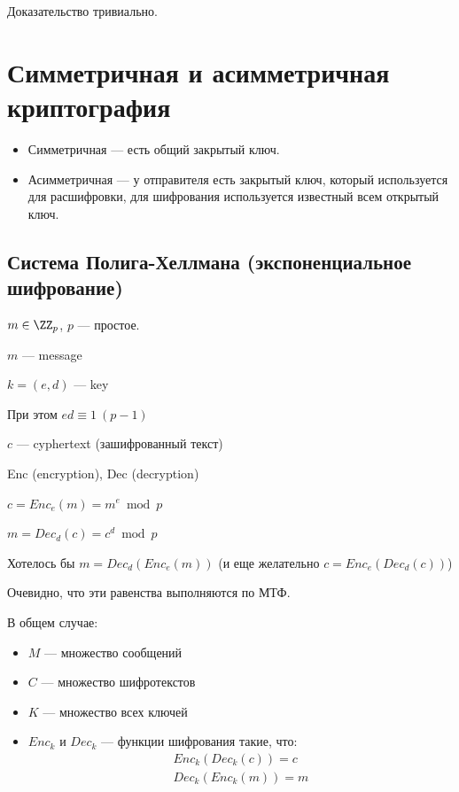 Доказательство тривиально.

\newpage

\section{Симметричная и асимметричная криптография}

\begin{defn}{}{}
    \begin{itemize}
        \item
            Симметричная --- есть общий закрытый ключ.
        \item
            Асимметричная --- у отправителя есть закрытый ключ,
            который используется для расшифровки, для шифрования используется
            известный всем открытый ключ.
    \end{itemize}
\end{defn}

\subsection{Система Полига-Хеллмана (экспоненциальное шифрование)}

\( m \in \ZZ_p \), \( p \) --- простое.

\( m \) --- message

\( k = (e, d) \) --- key

При этом \( ed \equiv 1 \: (p - 1) \)

\( c \) --- cyphertext (зашифрованный текст)

Enc (encryption), Dec (decryption)

\( c = Enc_e(m) = m^e \bmod p \)

\( m = Dec_d(c) = c^d \bmod p \)

Хотелось бы \( m = Dec_d ( Enc_e (m) ) \) (и еще желательно \( c = Enc_e ( Dec_d (c) ) \))

Очевидно, что эти равенства выполняются по МТФ.

В общем случае:
\begin{itemize}
    \item
        \( M \) --- множество сообщений
    \item
        \( C \) --- множество шифротекстов
    \item
        \( K \) --- множество всех ключей
    \item
        \( Enc_k \) и \( Dec_k \) --- функции шифрования такие,
        что:
        \begin{gather*}
            Enc_k ( Dec_k (c) ) = c
            \\
            Dec_k ( Enc_k (m) ) = m
        \end{gather*}
\end{itemize}

